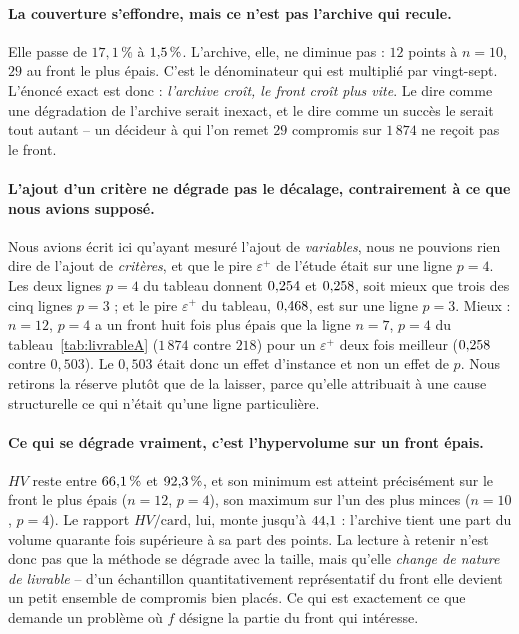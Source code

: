 \documentclass[11pt,a4paper]{article}
\theoremstyle{plain}
\theoremstyle{remark}
\begin{document}
\paragraph{La couverture s'effondre, mais ce n'est pas l'archive qui recule.}
Elle passe de $17{,}1\,\%$ à $1{,}5{}\,\%$. L'archive, elle, ne
diminue pas : $12$ points à $n=10$, $29$ au front le plus épais. C'est le
dénominateur qui est multiplié par vingt-sept. L'énoncé exact est donc :
\emph{l'archive croît, le front croît plus vite}. Le dire comme une
dégradation de l'archive serait inexact, et le dire comme un succès le
serait tout autant -- un décideur à qui l'on remet $29$ compromis sur
$1\,874$ ne reçoit pas le front.

\paragraph{L'ajout d'un critère ne dégrade pas le décalage, contrairement à
ce que nous avions supposé.}
Nous avions écrit ici qu'ayant mesuré l'ajout de \emph{variables}, nous ne
pouvions rien dire de l'ajout de \emph{critères}, et que le pire
$\varepsilon^+$ de l'étude était sur une ligne $p=4$. Les deux lignes $p=4$
du tableau donnent $0{,}254{}$ et $0{,}258{}$, soit mieux
que trois des cinq lignes $p=3$ ; et le pire $\varepsilon^+$ du tableau,
$0{,}468{}$, est sur une ligne $p=3$. Mieux : $n=12$, $p=4$ a un front
huit fois plus épais que la ligne $n=7$, $p=4$ du
tableau~\ref{tab:livrableA} ($1\,874$ contre $218$) pour un
$\varepsilon^+$ deux fois meilleur ($0{,}258{}$ contre
$0{,}503$). Le
$0{,}503$ était donc un effet d'instance et non un effet de $p$. Nous
retirons la réserve plutôt que de la laisser, parce qu'elle attribuait à une
cause structurelle ce qui n'était qu'une ligne particulière.

\paragraph{Ce qui se dégrade vraiment, c'est l'hypervolume sur un front épais.}
$HV$ reste entre $66{,}1{}\,\%$ et $92{,}3{}\,\%$, et son minimum
est atteint précisément sur le front le plus épais ($n=12$, $p=4$),
son maximum sur l'un des plus minces ($n=10$, $p=4$). Le rapport $HV/\text{card}$, lui, monte jusqu'à
$44{,}1{}$ : l'archive tient une part du volume quarante fois
supérieure à sa part des points. La lecture à retenir n'est donc pas que la
méthode se dégrade avec la taille, mais qu'elle \emph{change de nature de
livrable} -- d'un échantillon quantitativement représentatif du front elle
devient un petit ensemble de compromis bien placés. Ce qui est exactement ce
que demande un problème où $f$ désigne la partie du front qui intéresse.
\end{document}
